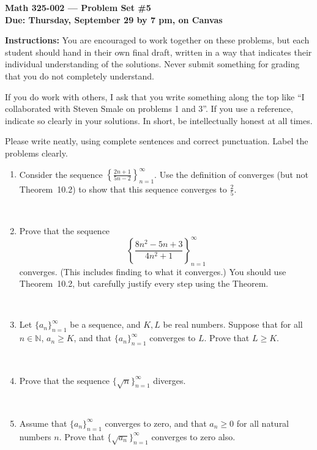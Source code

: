\documentclass{amsart}
\def\R{\mathbb R}
\def\N{\mathbb N}
\def\ds{\displaystyle}
\begin{document}
\begin{center}
{\large\bfseries
Math 325-002 --- Problem Set \#5 \\
Due: Thursday, September 29 by 7 pm, on Canvas}
\end{center}





{\bf Instructions:} You are encouraged to work together on these
problems, but each student should hand in their own final draft,
written in a way that indicates their individual understanding of
the solutions. Never submit something for grading
that you do not completely understand. 

If you do work with others, I ask that you write something along the
top like ``I collaborated with Steven Smale on problems 1 and 3''.
If you use a reference, indicate so clearly in your solutions. 
In short, be intellectually
honest at all times.

Please write neatly, using complete sentences and correct
punctuation. Label the problems clearly. 






\begin{enumerate}

\item Consider the sequence $\ds \left\{ \frac{2n+1}{5n-2} \right\}_{n=1}^\infty$.
Use the definition of converges (but not Theorem~10.2) to show that this sequence converges to $\ds \frac{2}{5}$.

\

\item Prove that the sequence \[ \left\{ \frac{ 8 n^2 - 5n +3} {4 n^2 + 1} \right\}_{n=1}^\infty\]
converges. (This includes finding to what it converges.) You should use Theorem~10.2, but carefully justify every step using the Theorem.

\


\item Let $\{a_n\}_{n=1}^\infty$ be a sequence, and $K,L$ be real numbers. Suppose that for all $n\in \N$, $a_n\geq K$, and that $\{a_n\}_{n=1}^\infty$ converges to $L$. Prove that $L\geq K$. 

 
 \

\item Prove that the sequence $\{\sqrt{n}\}_{n=1}^\infty$ diverges.

\

\item Assume that $\{a_n\}_{n=1}^\infty$ converges to zero, and that $a_n\geq 0$ for all natural numbers $n$. Prove that $\{ \sqrt{a_n}\}_{n=1}^\infty$ converges to zero also.






\end{enumerate}
\end{document}
